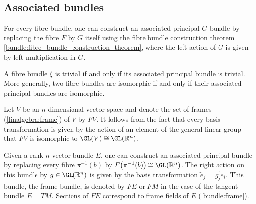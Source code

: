 
\subsection{Associated bundles}

    \begin{construct}\label{bundle:associated_bundle_construction}
        For every fibre bundle, one can construct an associated principal $G$-bundle by replacing the fibre $F$ by $G$ itself using the fibre bundle construction theorem \ref{bundle:fibre_bundle_construction_theorem}, where the left action of $G$ is given by left multiplication in $G$.
    \end{construct}

    \begin{property}[Triviality]
        A fibre bundle $\xi$ is trivial if and only if its associated principal bundle is trivial. More generally, two fibre bundles are isomorphic if and only if their associated principal bundles are isomorphic.
    \end{property}

    \begin{example}\label{bundle:frame_bundle}
        Let $V$ be an $n$-dimensional vector space and denote the set of frames (\cref{linalgebra:frame}) of $V$ by $FV$. It follows from the fact that every basis transformation is given by the action of an element of the general linear group that $FV$ is isomorphic to $\GL(V)\cong\GL(\mathbb{R}^n)$.

        Given a rank-$n$ vector bundle $E$, one can construct an associated principal bundle by replacing every fibre $\pi^{-1}(b)$ by $F\bigl(\pi^{-1}(b)\bigr)\cong\GL(\mathbb{R}^n)$. The right action on this bundle by $g\in\GL(\mathbb{R}^n)$ is given by the basis transformation $\widetilde{e}_j=g^i_je_i$. This bundle, the frame bundle, is denoted by $FE$ or $FM$ in the case of the tangent bundle $E=TM$. Sections of $FE$ correspond to frame fields of $E$ (\cref{bundle:frame}).
    \end{example}

